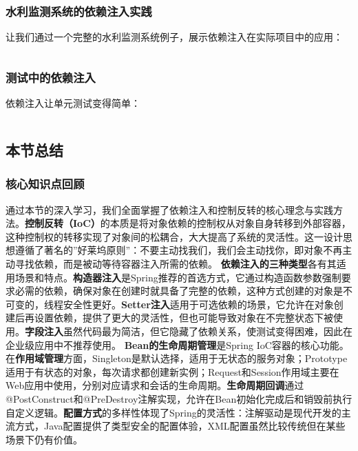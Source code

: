 \subsubsection{水利监测系统的依赖注入实践}\label{ux6c34ux5229ux76d1ux6d4bux7cfbux7edfux7684ux4f9dux8d56ux6ce8ux5165ux5b9eux8df5}
让我们通过一个完整的水利监测系统例子，展示依赖注入在实际项目中的应用： \begin{lstlisting}[language=Java] \end{lstlisting}
\subsubsection{测试中的依赖注入}\label{ux6d4bux8bd5ux4e2dux7684ux4f9dux8d56ux6ce8ux5165} 依赖注入让单元测试变得简单：
\begin{lstlisting}[language=Java] \end{lstlisting} \subsection{本节总结}\label{ux672cux8282ux603bux7ed3-2}
\subsubsection{核心知识点回顾}\label{ux6838ux5fc3ux77e5ux8bc6ux70b9ux56deux987e-2}
通过本节的深入学习，我们全面掌握了依赖注入和控制反转的核心理念与实践方法。\textbf{控制反转（IoC）}的本质是将对象依赖的控制权从对象自身转移到外部容器，这种控制权的转移实现了对象间的松耦合，大大提高了系统的灵活性。这一设计思想遵循了著名的''好莱坞原则''：不要主动找我们，我们会主动找你，即对象不再主动寻找依赖，而是被动等待容器注入所需的依赖。
\textbf{依赖注入的三种类型}各有其适用场景和特点。\textbf{构造器注入}是Spring推荐的首选方式，它通过构造函数参数强制要求必需的依赖，确保对象在创建时就具备了完整的依赖，这种方式创建的对象是不可变的，线程安全性更好。\textbf{Setter注入}适用于可选依赖的场景，它允许在对象创建后再设置依赖，提供了更大的灵活性，但也可能导致对象在不完整状态下被使用。\textbf{字段注入}虽然代码最为简洁，但它隐藏了依赖关系，使测试变得困难，因此在企业级应用中不推荐使用。
\textbf{Bean的生命周期管理}是Spring
IoC容器的核心功能。在\textbf{作用域管理}方面，Singleton是默认选择，适用于无状态的服务对象；Prototype适用于有状态的对象，每次请求都创建新实例；Request和Session作用域主要在Web应用中使用，分别对应请求和会话的生命周期。\textbf{生命周期回调}通过@PostConstruct和@PreDestroy注解实现，允许在Bean初始化完成后和销毁前执行自定义逻辑。\textbf{配置方式}的多样性体现了Spring的灵活性：注解驱动是现代开发的主流方式，Java配置提供了类型安全的配置体验，XML配置虽然比较传统但在某些场景下仍有价值。
